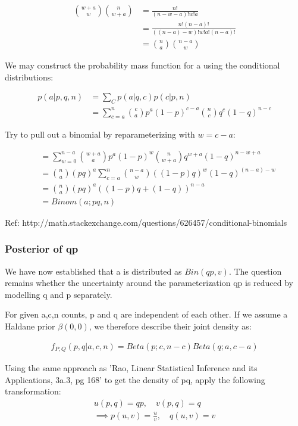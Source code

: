 \documentclass[12pt]{article}
\begin{document}
\begin{align}
{w+a \choose w}{n \choose w+a} &= \frac{n!}{(n-w-a)!w!a} \\
	&= \frac{n!(n-a)!}{((n-a)-w)!w!a!(n-a)!} \\
	&=  {n \choose a}{n-a \choose w}
\end{align}

We may construct the probability mass function for a using the conditional distributions:

\begin{align}
p(a|p,q,n) &= \sum_C p(a|q,c)p(c|p,n) \\
 &= \sum_{c=a}^n {c \choose a} p^a(1-p)^{c-a} {n \choose c} q^c (1-q)^{n-c}
\end{align}

Try to pull out a binomial by reparameterizing with $ w = c-a$:

\begin{align}
&= \sum_{w=0}^{n-a} {w+a \choose a} p^a(1-p)^w {n \choose w+a} q^{w+a} (1-q)^{n-w+a} \\
&= {n \choose a} (pq)^a \sum_{c=a}^n {n-a \choose w} ((1-p)q)^w (1-q)^{(n-a)-w} \\
&= {n \choose a} (pq)^a ((1-p)q +  (1-q))^{n-a} \\
&= Binom(a;pq,n)
\end{align}

Ref: http://math.stackexchange.com/questions/626457/conditional-binomials

\subsubsection{Posterior of qp}

We have now established that a is distributed as $Bin(qp,v)$. The question remains whether the uncertainty around the parameterization qp is reduced by modelling q and p separately.

For given a,c,n counts, p and q are independent of each other. If we assume a Haldane prior $\beta(0,0)$, we therefore describe their joint density as:

\begin{align}
 f_{P,Q}(p,q|a,c,n) = Beta(p;c,n-c) Beta(q;a,c-a)
\end{align}

Using the same approach as 'Rao, Linear Statistical Inference and its Applications, 3a.3, pg 168' to get the density of pq, apply the following transformation:
\begin{align}
 u(p,q) = qp, \quad v(p,q) = q  \\
 \implies p(u,v) = \frac{u}{v}, \quad q(u,v) = v
\end{align}
\end{document}
